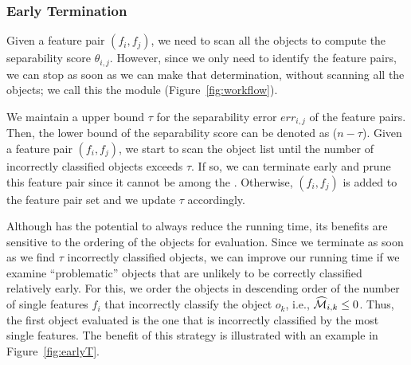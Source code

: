 \subsubsection{Early Termination} \label{ssec:earlyT}

Given a feature pair $(f_i,f_j)$,
we need to scan all the objects
to compute the separability score $\theta_{i,j}$.
However, since we only need to identify the \topk feature pairs,
we can stop as soon as we can make that determination, without
scanning all the objects; we call this the \earlyT module (Figure~\ref{fig:workflow}).

 We maintain a upper bound $\tau$
for the separability error $err_{i,j}$ of the \topk feature pairs.
Then, the lower bound of the separability
score can be denoted as ($n-\tau$).
Given a feature pair $(f_i,f_j)$, we start to scan the object list until the number of incorrectly classified objects exceeds $\tau$. If so, we can terminate early and prune this feature pair since it cannot be among the \topk.
Otherwise, $(f_i,f_j)$ is added to the \topk feature pair set and we update $\tau$ accordingly.

Although \earlyT has the potential to always reduce the running time, its benefits are sensitive to the ordering of the objects for evaluation. Since we terminate as soon as we find $\tau$ incorrectly classified objects, we can improve our running time if we examine ``problematic'' objects that are unlikely to be correctly classified relatively early.
For this,
we order the objects in descending order of
the number of single features $f_i$ that incorrectly
classify the object $o_k$, i.e., $\widehat{{\mathcal{M}}}_{i,k}\leq0$.
Thus, the first object evaluated is the one that is incorrectly
classified by the most single features. The benefit of this strategy is illustrated with an example in Figure~\ref{fig:earlyT}.



